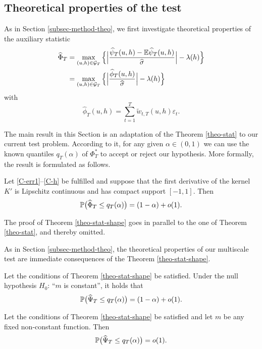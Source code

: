 \documentclass[a4paper,12pt]{article}
\numberwithin{equation}{section}
\begin{document}
\subsection{Theoretical properties of the test}\label{subsec-test-shape-theo}

As in Section \ref{subsec-method-theo}, we first investigate theoretical properties of the auxiliary statistic 
\begin{align*}
\widehat{\Phi}_T 
 & = \max_{(u,h) \in \mathcal{G}_T} \Big\{ \Big| \frac{\widehat{\psi}_T(u,h) - \mathbb{E} \widehat{\psi}_T(u,h)}{\widehat{\sigma}} \Big| - \lambda(h) \Big\} \\
 & = \max_{(u,h) \in \mathcal{G}_T} \Big\{ \Big| \frac{\widehat{\phi}_T(u,h)} {\widehat{\sigma}} \Big| - \lambda(h) \Big \} 
\end{align*}
with 
\[ \widehat{\phi}_T(u,h) = \sum\limits_{t=1}^T \widetilde{w}_{t,T}(u,h) \varepsilon_t. \]


The main result in this Section is an adaptation of the Theorem \ref{theo-stat} to our current test problem. According to it, for any given $\alpha \in (0,1)$ we can use the known quantiles $q_T(\alpha)$ of $\Phi_T^*$ to accept or reject our hypothesis. More formally, the result is formulated as follows. 
\begin{theorem}\label{theo-stat-shape}
Let \ref{C-err1}--\ref{C-h} be fulfilled and suppose that the first derivative of the kernel $K'$ is Lipschitz continuous and has compact support $[-1,1]$. Then 
\[ \mathbb{P} \big( \widehat{\Phi}_T \le q_T(\alpha) \big) = (1 - \alpha) + o(1). \]
\end{theorem}
The proof of Theorem \ref{theo-stat-shape} goes in parallel to the one of Theorem \ref{theo-stat}, and thereby omitted.

As in Section \ref{subsec-method-theo}, the theoretical properties of our multiscale test are immediate consequences of the Theorem \ref{theo-stat-shape}. 
\begin{corollary}\label{corollary-test-shape-1}
Let the conditions of Theorem \ref{theo-stat-shape} be satisfied. Under the null hypothesis $H_0$: ``$m$ is constant'', it holds that 
\[ \mathbb{P} \big( \widehat{\Psi}_T \le q_T(\alpha) \big) = (1 - \alpha) + o(1). \]
\end{corollary}
\begin{corollary}\label{corollary-test-shape-2}
Let the conditions of Theorem \ref{theo-stat-shape} be satisfied and let $m$ be any fixed non-constant function. Then 
\[ \mathbb{P} \big( \widehat{\Psi}_T \le q_T(\alpha) \big) = o(1). \]
\end{corollary}
\end{document}
